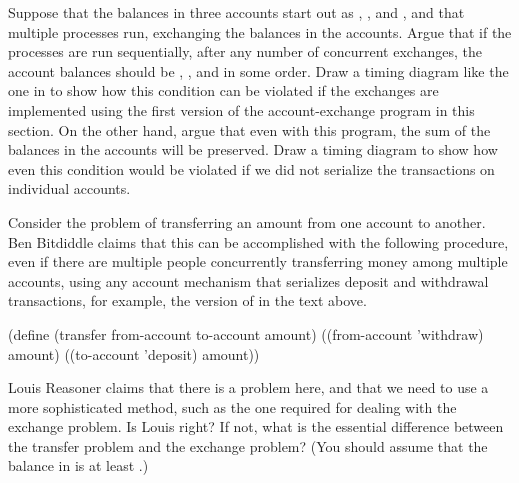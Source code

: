 \begin{exercise}
	\label{Exercise 3.43}
	Suppose that the balances in three accounts start out as , , and , and that multiple processes run, exchanging the balances in the accounts.
	Argue that if the processes are run sequentially, after any number of concurrent exchanges, the account balances should be , , and  in some order.
	Draw a timing diagram like the one in  to show how this condition can be violated if the exchanges are implemented using the first version of the account-exchange program in this section.
	On the other hand, argue that even with this  program, the sum of the balances in the accounts will be preserved.
	Draw a timing diagram to show how even this condition would be violated if we did not serialize the transactions on individual accounts.
\end{exercise}



\begin{exercise}
	\label{Exercise 3.44}
	Consider the problem of transferring an amount from one account to another.
	Ben Bitdiddle claims that this can be accomplished with the following procedure, even if there are multiple people concurrently transferring money among multiple accounts, using any account mechanism that serializes deposit and withdrawal transactions, for example, the version of  in the text above.
	\begin{scheme}
	  (define (transfer from-account to-account amount)
	    ((from-account 'withdraw) amount)
	    ((to-account 'deposit) amount))
	\end{scheme}
	Louis Reasoner claims that there is a problem here, and that we need to use a more sophisticated method, such as the one required for dealing with the exchange problem.
	Is Louis right?
	If not, what is the essential difference between the transfer problem and the exchange problem?
	(You should assume that the balance in  is at least .)
\end{exercise}



